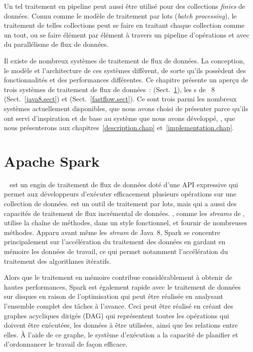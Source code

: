Un tel traitement en pipeline peut aussi \^etre utilis\'e pour des collections \emph{finies} de donn\'ees. Connu comme le mod\`ele de traitement par lots (\emph{batch processing}), le traitement de telles collections peut se faire en traitant chaque collection comme un tout, ou se faire \'el\'ement par \'el\'ement \`a travers un pipeline d'op\'erations et avec du parall\'elisme de flux de donn\'ees.


Il existe de nombreux syst\`emes de traitement de flux de donn\'ees. La conception, le mod\`ele et l'architecture de ces syst\`emes diff\`erent, de sorte qu'ils poss\`edent des fonctionnalit\'es et des performances diff\'erentes. Ce chapitre pr\'esente un aper\c{c}u de trois syst\`emes de traitement de flux de donn\'ees~:  (Sect.~\ref{spark.sect}), les s de ~8 (Sect.~\ref{java8.sect}) et  (Sect.~\ref{fastflow.sect}).  Ce sont trois parmi les nombreux syst\`emes actuellement disponibles, que nous avons choisi de pr\'esenter parce qu'ils ont servi d'inspiration et de base au syst\`eme que nous avons d\'evelopp\'e, \ppff, que nous pr\'esenterons aux chapitres~\ref{description.chap} et~\ref{implementation.chap}.


\section{Apache Spark}

\label{spark.sect}


~\citep{apachSpark} est un engin de traitement de flux de donn\'ees dot\'e d'une API expressive qui permet aux d\'eveloppeurs d'ex\'ecuter efficacement plusieurs op\'erations sur une collection de donn\'ees.  est un outil de traitement par lots, mais qui a aussi des capacit\'es de traitement de flux incr\'emental de donn\'ees. , comme les \emph{streams} de , utilise la cha\^ine de m\'ethodes, dans un style fonctionnel, et fournir de nombreuses m\'ethodes. Apparu avant m\^eme les \emph{stream} de Java~8, Spark se concentre principalement sur l'acc\'el\'eration du traitement des donn\'ees en gardant en m\'emoire les donn\'ees de travail, ce qui permet notamment l'acc\'el\'eration du traitement des algorithmes it\'eratifs.

Alors que le traitement en m\'emoire contribue consid\'erablement \`a obtenir de hautes performances, Spark est \'egalement rapide avec le traitement de donn\'ees sur disques en raison de l'optimisation qui peut \^etre r\'ealis\'ee en analysant l'ensemble complet des t\^aches \`a l'avance. Ceci peut \^etre r\'ealis\'e en cr\'eant des graphes acycliques dirig\'es (DAG) qui repr\'esentent toutes les op\'erations qui doivent \^etre ex\'ecut\'ees, les donn\'ees \`a \^etre utilis\'ees, ainsi que les relations entre elles. \`A l'aide de ce graphe, le syst\`eme d'ex\'ecution a la capacit\'e de planifier et d'ordonnancer le travail de fa\c{c}on efficace.

